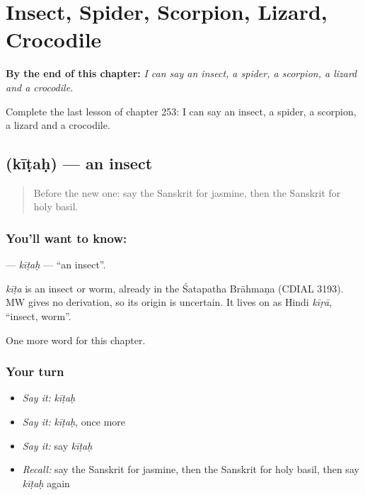 
\chapter{Insect, Spider, Scorpion, Lizard, Crocodile}
\label{ch:sa-insect-spider-scorpion-lizard-crocodile}

\begin{chapteropening}
\textbf{By the end of this chapter:} \emph{I can say an insect, a spider, a scorpion, a lizard and a crocodile.}

Complete the last lesson of chapter 253: I can say an insect, a spider, a scorpion, a lizard and a crocodile.
\end{chapteropening}

\section[\texorpdfstring{\sk{कीटः} (kīṭaḥ)}{कीटः (kīṭaḥ)}]{ (kīṭaḥ) — an insect}

\label{lesson:SA-C253-kitah}



\begin{quote}
Before the new one: say the Sanskrit for jasmine, then the Sanskrit for holy basil.
\end{quote}

\subsection*{You'll want to know: }
\textbf{} — \emph{kīṭaḥ} — \textquotedblleft{}an insect\textquotedblright{}.

\begin{cousinweb}
\emph{kīṭa} is an insect or worm, already in the Śatapatha Brāhmaṇa (CDIAL 3193). MW gives no derivation, so its origin is uncertain. It lives on as Hindi \emph{kīṛā}, \textquotedblleft{}insect, worm\textquotedblright{}.
\end{cousinweb}

\begin{grammarlens}[title={What you've built}]
One more word for this chapter.
\end{grammarlens}

\subsection*{Your turn}
\begin{itemize}
\raggedright
  \item \emph{Say it:} \emph{kīṭaḥ}
  \item \emph{Say it:} \emph{kīṭaḥ}, once more
  \item \emph{Say it:} say \emph{kīṭaḥ}
  \item \emph{Recall:} say the Sanskrit for jasmine, then the Sanskrit for holy basil, then say \emph{kīṭaḥ} again
\end{itemize}

